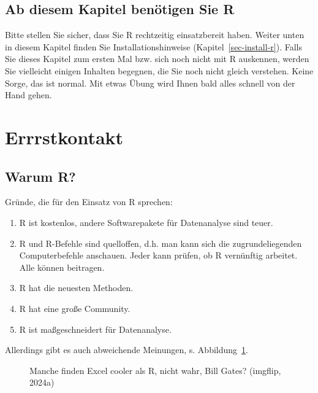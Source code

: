 \documentclass[
  a4paper,
]{scrbook}
\theoremstyle{definition}
\theoremstyle{definition}
\theoremstyle{definition}
\theoremstyle{remark}
\begin{document}
\subsection{Ab diesem Kapitel benötigen Sie
R}\label{ab-diesem-kapitel-benuxf6tigen-sie-r}

Bitte stellen Sie sicher, dass Sie R rechtzeitig einsatzbereit haben.
Weiter unten in diesem Kapitel finden Sie Installationshinweise
(Kapitel~\ref{sec-install-r}). Falls Sie dieses Kapitel zum ersten Mal
bzw. sich noch nicht mit R auskennen, werden Sie vielleicht einigen
Inhalten begegnen, die Sie noch nicht gleich verstehen. Keine Sorge, das
ist normal. Mit etwas Übung wird Ihnen bald alles schnell von der Hand
gehen.

\section{Errrstkontakt}\label{errrstkontakt}

\subsection{Warum R?}\label{warum-r}

Gründe, die für den Einsatz von R sprechen:

\begin{enumerate}
\def\labelenumi{\arabic{enumi}.}
\item
  R ist kostenlos, andere Softwarepakete für Datenanalyse sind teuer.
\item
  R und R-Befehle sind quelloffen, d.h. man kann sich die
  zugrundeliegenden Computerbefehle anschauen. Jeder kann prüfen, ob R
  vernünftig arbeitet. Alle können beitragen.
\item
  R hat die neuesten Methoden.
\item
  R hat eine große Community.
\item
  R ist maßgeschneidert für Datenanalyse.
\end{enumerate}

Allerdings gibt es auch abweichende Meinungen, s.
Abbildung~\ref{fig-bill-excel}.

\begin{figure}


\caption{\label{fig-bill-excel}Manche finden Excel cooler als R, nicht
wahr, Bill Gates? (imgflip, 2024a)}

\end{figure}%
\end{document}
